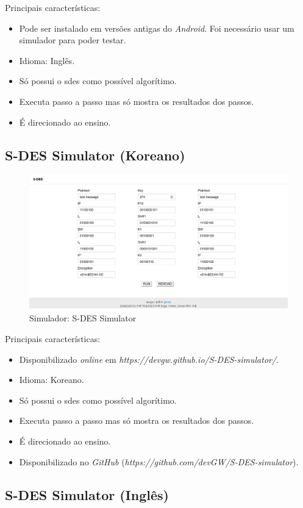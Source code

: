 Principais características:
\begin{itemize}
    \item Pode ser instalado em versões antigas do \textit{Android}. Foi necessário usar um simulador para poder testar.
    \item Idioma: Inglês.
    \item Só possui o \acrshort{sdes} como possível algorítimo.
    \item Executa passo a passo mas só mostra os resultados dos passos.
    \item É direcionado ao ensino.
\end{itemize}

\subsection{S-DES Simulator (Koreano)}

\begin{figure}[H]
    \centering
    \caption{Simulador: S-DES Simulator}
    \includegraphics[width=.75\linewidth]{Simuladores/SDESSimulatorKr.png}
\end{figure}

Principais características:
\begin{itemize}
    \item Disponibilizado \textit{online} em \textit{https://devgw.github.io/S-DES-simulator/}.
    \item Idioma: Koreano.
    \item Só possui o \acrshort{sdes} como possível algorítimo.
    \item Executa passo a passo mas só mostra os resultados dos passos.
    \item É direcionado ao ensino.
    \item Disponibilizado no \textit{GitHub} (\textit{https://github.com/devGW/S-DES-simulator}).
\end{itemize}

\subsection{S-DES Simulator (Inglês)}

